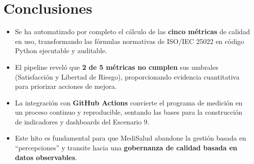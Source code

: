 \documentclass[12pt,a4paper]{article}
\begin{document}
\section{Conclusiones}

\begin{tcolorbox}[colback=green!5, colframe=green!50!black, title=Resultado obtenido]
\begin{itemize}
    \item Se ha automatizado por completo el c\'alculo de las \textbf{cinco m\'etricas} de calidad en uso, transformando las f\'ormulas normativas de ISO/IEC 25022 en c\'odigo Python ejecutable y auditable.
    \item El pipeline revel\'o que \textbf{2 de 5 m\'etricas no cumplen} sus umbrales (Satisfacci\'on y Libertad de Riesgo), proporcionando evidencia cuantitativa para priorizar acciones de mejora.
    \item La integraci\'on con \textbf{GitHub Actions} convierte el programa de medici\'on en un proceso continuo y reproducible, sentando las bases para la construcci\'on de indicadores y dashboards del Escenario 9.
    \item Este hito es fundamental para que MediSalud abandone la gesti\'on basada en ``percepciones'' y transite hacia una \textbf{gobernanza de calidad basada en datos observables}.
\end{itemize}
\end{tcolorbox}
\end{document}
